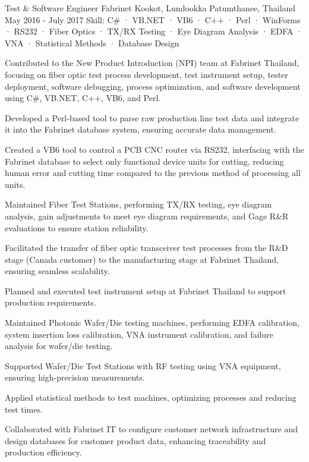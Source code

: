 \begin{cventries}
  \cventry
    {Test \& Software Engineer} %
    {Fabrinet} %
    {Kookot, Lumlookka Patumthanee, Thailand} %
    {May 2016 - July 2017} %
    {Skill: C\# · VB.NET · VB6 · C++ · Perl · WinForms · RS232 · Fiber Optics · TX/RX Testing · Eye Diagram Analysis · EDFA · VNA · Statistical Methods · Database Design} %
    {
      \begin{cvitems} %
       \item {Contributed to the New Product Introduction (NPI) team at Fabrinet Thailand, focusing on fiber optic test process development, test instrument setup, tester deployment, software debugging, process optimization, and software development using C\#, VB.NET, C++, VB6, and Perl.}
       \item {Developed a Perl-based tool to parse raw production line test data and integrate it into the Fabrinet database system, ensuring accurate data management.}
       \item {Created a VB6 tool to control a PCB CNC router via RS232, interfacing with the Fabrinet database to select only functional device units for cutting, reducing human error and cutting time compared to the previous method of processing all units.}
       \item {Maintained Fiber Test Stations, performing TX/RX testing, eye diagram analysis, gain adjustments to meet eye diagram requirements, and Gage R\&R evaluations to ensure station reliability.}
       \item {Facilitated the transfer of fiber optic transceiver test processes from the R\&D stage (Canada customer) to the manufacturing stage at Fabrinet Thailand, ensuring seamless scalability.}
       \item {Planned and executed test instrument setup at Fabrinet Thailand to support production requirements.}
       \item {Maintained Photonic Wafer/Die testing machines, performing EDFA calibration, system insertion loss calibration, VNA instrument calibration, and failure analysis for wafer/die testing.}
       \item {Supported Wafer/Die Test Stations with RF testing using VNA equipment, ensuring high-precision measurements.}
       \item {Applied statistical methods to test machines, optimizing processes and reducing test times.}
       \item {Collaborated with Fabrinet IT to configure customer network infrastructure and design databases for customer product data, enhancing traceability and production efficiency.}
      \end{cvitems}
    }


\end{cventries}
